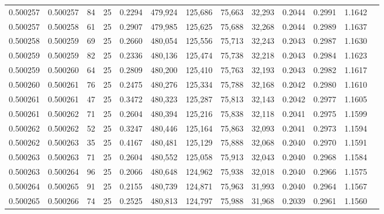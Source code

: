 \begin{tabular}{rrrrrrrrrrrrr}
0.500257 & 0.500257 &  84 &  25 &                                     0.2294 & 479,924 & 125,686 &  75,663 &  32,293 & 0.2044 & 0.2991 & 1.1642 \\
0.500257 & 0.500258 &  61 &  25 &                                     0.2907 & 479,985 & 125,625 &  75,688 &  32,268 & 0.2044 & 0.2989 & 1.1637 \\
0.500258 & 0.500259 &  69 &  25 &                                     0.2660 & 480,054 & 125,556 &  75,713 &  32,243 & 0.2043 & 0.2987 & 1.1630 \\
0.500259 & 0.500259 &  82 &  25 &                                     0.2336 & 480,136 & 125,474 &  75,738 &  32,218 & 0.2043 & 0.2984 & 1.1623 \\
0.500259 & 0.500260 &  64 &  25 &                                     0.2809 & 480,200 & 125,410 &  75,763 &  32,193 & 0.2043 & 0.2982 & 1.1617 \\
0.500260 & 0.500261 &  76 &  25 &                                     0.2475 & 480,276 & 125,334 &  75,788 &  32,168 & 0.2042 & 0.2980 & 1.1610 \\
0.500261 & 0.500261 &  47 &  25 &                                     0.3472 & 480,323 & 125,287 &  75,813 &  32,143 & 0.2042 & 0.2977 & 1.1605 \\
0.500261 & 0.500262 &  71 &  25 &                                     0.2604 & 480,394 & 125,216 &  75,838 &  32,118 & 0.2041 & 0.2975 & 1.1599 \\
0.500262 & 0.500262 &  52 &  25 &                                     0.3247 & 480,446 & 125,164 &  75,863 &  32,093 & 0.2041 & 0.2973 & 1.1594 \\
0.500262 & 0.500263 &  35 &  25 &                                     0.4167 & 480,481 & 125,129 &  75,888 &  32,068 & 0.2040 & 0.2970 & 1.1591 \\
0.500263 & 0.500263 &  71 &  25 &                                     0.2604 & 480,552 & 125,058 &  75,913 &  32,043 & 0.2040 & 0.2968 & 1.1584 \\
0.500263 & 0.500264 &  96 &  25 &                                     0.2066 & 480,648 & 124,962 &  75,938 &  32,018 & 0.2040 & 0.2966 & 1.1575 \\
0.500264 & 0.500265 &  91 &  25 &                                     0.2155 & 480,739 & 124,871 &  75,963 &  31,993 & 0.2040 & 0.2964 & 1.1567 \\
0.500265 & 0.500266 &  74 &  25 &                                     0.2525 & 480,813 & 124,797 &  75,988 &  31,968 & 0.2039 & 0.2961 & 1.1560 \\

\end{tabular}
